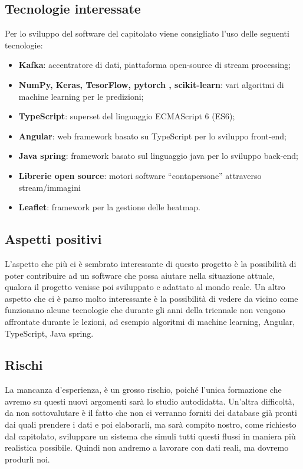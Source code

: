 \documentclass[../studio-di-fattibilita.tex]{subfiles}
\begin{document}
\subsection{Tecnologie interessate}%
\label{sub:tecnologie_interessate}
Per lo sviluppo del software del capitolato viene consigliato l’uso delle seguenti tecnologie:
\begin{itemize}
  \item \textbf{Kafka}: accentratore di dati, piattaforma open-source di stream processing;
  \item \textbf{NumPy, Keras, TesorFlow, pytorch , scikit-learn}: vari algoritmi di machine learning per le predizioni;
  \item \textbf{TypeScript}: superset del linguaggio ECMAScript 6 (ES6);
  \item \textbf{Angular}: web framework basato su TypeScript per lo sviluppo front-end;
  \item \textbf{Java spring}: framework basato sul linguaggio java per lo sviluppo back-end;
  \item \textbf{Librerie open source}: motori software “contapersone” attraverso stream/immagini
  \item \textbf{Leaflet}: framework per la gestione delle heatmap.
\end{itemize}

\subsection{Aspetti positivi}%
\label{sub:aspetti_positivi}
L’aspetto che più ci è sembrato interessante di questo progetto è la possibilità di poter contribuire ad un software che possa aiutare nella situazione attuale, qualora il progetto venisse poi sviluppato e adattato al mondo reale. Un altro aspetto che ci è parso molto interessante è la possibilità di vedere da vicino come funzionano alcune tecnologie che durante gli anni della triennale non vengono affrontate durante le lezioni, ad esempio algoritmi di machine learning, Angular, TypeScript, Java spring.

\subsection{Rischi}%
\label{sub:rischi}
La mancanza d’esperienza, è un grosso rischio, poiché l’unica formazione che avremo su questi nuovi argomenti sarà lo studio autodidatta. Un’altra difficoltà, da non sottovalutare è il fatto che non ci verranno forniti dei database già pronti dai quali prendere i dati e poi elaborarli, ma sarà compito nostro, come richiesto dal capitolato, sviluppare un sistema che simuli tutti questi flussi in maniera più realistica possibile. Quindi non andremo a lavorare con dati reali, ma dovremo produrli noi.
\end{document}
